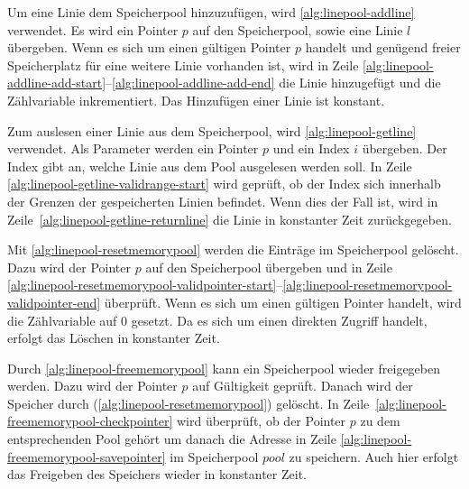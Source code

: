 



Um eine Linie dem Speicherpool hinzuzufügen, wird \autoref{alg:linepool-addline} verwendet. Es wird ein Pointer $p$ auf
 den Speicherpool, sowie eine Linie $l$ übergeben. Wenn es sich um einen gültigen Pointer $p$ handelt und genügend
 freier Speicherplatz für eine weitere Linie vorhanden ist, wird in Zeile
 \ref{alg:linepool-addline-add-start}--\ref{alg:linepool-addline-add-end} die Linie hinzugefügt und die Zählvariable
 inkrementiert. Das Hinzufügen einer Linie ist konstant.



Zum auslesen einer Linie aus dem Speicherpool, wird \autoref{alg:linepool-getline} verwendet. Als Parameter werden ein
 Pointer $p$ und ein Index $i$ übergeben. Der Index gibt an, welche Linie aus dem Pool ausgelesen werden soll. In Zeile
 \ref{alg:linepool-getline-validrange-start} wird geprüft, ob der Index sich innerhalb der Grenzen der gespeicherten
 Linien befindet. Wenn dies der Fall ist, wird in Zeile~\ref{alg:linepool-getline-returnline} die Linie in konstanter
 Zeit zurückgegeben.



Mit \autoref{alg:linepool-resetmemorypool} werden die Einträge im Speicherpool gelöscht. Dazu wird der Pointer $p$ auf
 den Speicherpool übergeben und in Zeile
 \ref{alg:linepool-resetmemorypool-validpointer-start}--\ref{alg:linepool-resetmemorypool-validpointer-end} überprüft.
 Wenn es sich um einen gültigen Pointer handelt, wird die Zählvariable auf $0$ gesetzt. Da es sich um einen direkten
 Zugriff handelt, erfolgt das Löschen in konstanter Zeit.



Durch \autoref{alg:linepool-freememorypool} kann ein Speicherpool wieder freigegeben werden. Dazu wird der Pointer $p$
 auf Gültigkeit geprüft. Danach wird der Speicher durch 
 (\autoref{alg:linepool-resetmemorypool}) gelöscht. In Zeile~\ref{alg:linepool-freememorypool-checkpointer} wird
 überprüft, ob der Pointer $p$ zu dem entsprechenden Pool gehört um danach die Adresse in Zeile
 \ref{alg:linepool-freememorypool-savepointer} im Speicherpool $\mathit{pool}$ zu speichern. Auch hier erfolgt das
 Freigeben des Speichers wieder in konstanter Zeit.

